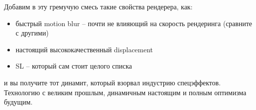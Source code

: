 Добавим в эту гремучую смесь такие свойства
   рендерера, как:

\begin{itemize} 
    \item быстрый motion blur – почти не влияющий на скорость рендеринга (сравните с другими)
    \item настоящий высококачественный displacement
    \item SL – который сам стоит целого списка
\end{itemize}
и вы получите тот динамит, который взорвал индустрию спецэффектов. Технологию с великим прошлым, динамичным настоящим и полным оптимизма
будущим.